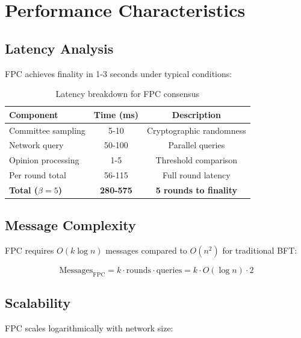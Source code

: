 \section{Performance Characteristics}

\label{sec:performance}

\subsection{Latency Analysis}

FPC achieves finality in 1-3 seconds under typical conditions:

\begin{table}[h]
\centering
\begin{tabular}{lcc}
\toprule
\textbf{Component} & \textbf{Time (ms)} & \textbf{Description} \\
\midrule
Committee sampling & 5-10 & Cryptographic randomness \\
Network query & 50-100 & Parallel queries \\
Opinion processing & 1-5 & Threshold comparison \\
Per round total & 56-115 & Full round latency \\
\midrule
\textbf{Total ($\beta=5$)} & \textbf{280-575} & \textbf{5 rounds to finality} \\
\bottomrule
\end{tabular}
\caption{Latency breakdown for FPC consensus}
\label{tab:latency}
\end{table}

\subsection{Message Complexity}

FPC requires $O(k \log n)$ messages compared to $O(n^2)$ for traditional BFT:

\begin{equation}
\text{Messages}_{\text{FPC}} = k \cdot \text{rounds} \cdot \text{queries} = k \cdot O(\log n) \cdot 2
\end{equation}

\subsection{Scalability}

FPC scales logarithmically with network size:

